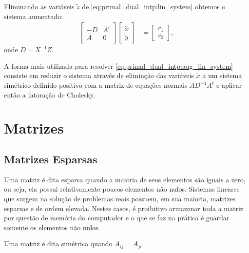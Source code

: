 Eliminando as variáveis $\tilde{z}$ de \eqref{eq:primal_dual_intp:lin_system}
obtemos o sistema aumentado:
\begin{align}
    \begin{bmatrix}
        -D & A^t \\
        A & 0
    \end{bmatrix} \begin{bmatrix}
        \tilde{x} \\
        \tilde{y}
    \end{bmatrix} &= \begin{bmatrix}
        r_1 \\
        r_2
    \end{bmatrix},
    \label{eq:primal_dual_intp:aug_lin_system}
\end{align}
onde $D = X^{-1} Z$.

A forma mais utilizada para resolver \eqref{eq:primal_dual_intp:aug_lin_system}
consiste em reduzir o sistema através de eliminção das variáveis $\tilde{x}$ a
um sistema simétrico definido positivo com a matriz de equações normais $A
D^{-1} A^t$ e aplicar então a fatoração de Cholesky.

\section{Matrizes}
\subsection{Matrizes Esparsas}
Uma matriz é dita esparsa quando a maioria de seus elementos são iguais a zero, ou seja, ela possui relativamente poucos elementos não nulos. Sistemas lineares que surgem na solução de problemas reais possuem, em sua maioria, matrizes esparsas e de ordem elevada. Nestes casos, é proibitivo armazenar toda a matriz por questão de memória do computador e o que se faz na prática é guardar somente os elementos não nulos.

Uma matriz é dita simétrica quando $A_{ij} = A_{ji}$.

